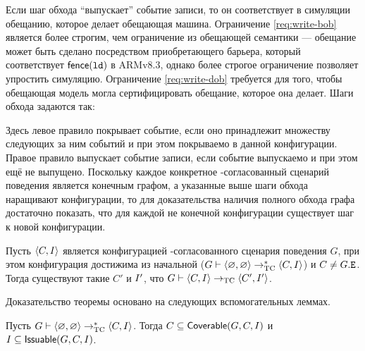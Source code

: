 Если шаг обхода  ``выпускает'' событие записи, то он соответствует в симуляции обещанию, которое делает обещающая машина.
Ограничение \ref{req:write-bob} является более строгим, чем ограничение из обещающей семантики ---
обещание может быть сделано  посредством приобретающего барьера, который соответствует $\mathsf{fence}({\mathtt{ld}})$ в ARMv8.3,
однако более строгое ограничение позволяет упростить симуляцию.
Ограничение \ref{req:write-dob} требуется для того, чтобы обещающая модель могла сертифицировать обещание, которое она
делает.
Шаги обхода задаются так:
Здесь левое правило покрывает событие, если оно принадлежит множеству
следующих за ним событий и при этом покрываемо в данной конфигурации.
Правое правило выпускает событие записи, если событие выпускаемо и при этом ещё не выпущено.
Поскольку каждое конкретное \ARM-согласованный сценарий поведения
является конечным графом,
а указанные выше шаги обхода наращивают конфигурации, то для доказательства наличия полного
обхода графа достаточно показать, что для каждой не конечной конфигурации существует шаг к новой конфигурации.
\begin{theorem}
  \label{prop:trav-step}
  Пусть ${\langle{C, I}\rangle}$ является конфигурацией \ARM-согласованного сценария поведения $G$,
  при этом конфигурация достижима из начальной
  ($G \vdash {\langle{\varnothing, \varnothing}\rangle} \rightarrow_{\rm TC}^{*} {\langle{C, I}\rangle}$) и $C \neq G.{\mathtt{E}}$.
  Тогда существуют такие $C'$ и $I'$, что
  $G \vdash {\langle{C, I}\rangle} \rightarrow_{\rm TC} {\langle{C', I'}\rangle}$.
\end{theorem}
Доказательство теоремы основано на следующих вспомогательных леммах.%
\begin{lemma}
  \label{prop:trav-prop-preserve}
  Пусть $G \vdash {\langle{\varnothing, \varnothing}\rangle} \rightarrow_{\rm TC}^{*} {\langle{C, I}\rangle}$.
  Тогда $C \subseteq {\sf Coverable}(G,C,I)$ и $I \subseteq {\sf Issuable}(G,C,I)$.
\end{lemma}
